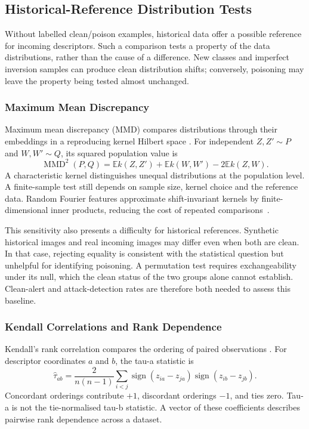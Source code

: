 \subsection{Historical-Reference Distribution Tests}
\label{subsec:bg-reference-tests}

Without labelled clean/poison examples, historical data offer a possible
reference for incoming descriptors. Such a comparison tests a property of
the data distributions, rather than the cause of a difference. New classes
and imperfect inversion samples can produce clean distribution shifts;
conversely, poisoning may leave the property being tested almost unchanged.

\subsubsection{Maximum Mean Discrepancy}

Maximum mean discrepancy (MMD) compares distributions through their
embeddings in a reproducing kernel Hilbert space
\cite{gretton2012mmd}. For independent $Z,Z'\sim P$ and $W,W'\sim Q$,
its squared population value is
\begin{equation}
 \operatorname{MMD}^2(P,Q)
 =\mathbb{E}k(Z,Z')+\mathbb{E}k(W,W')-2\mathbb{E}k(Z,W).
 \label{eq:bg-mmd}
\end{equation}
A characteristic kernel distinguishes unequal distributions at the
population level. A finite-sample test still depends on sample size,
kernel choice and the reference data. Random Fourier features approximate
shift-invariant kernels by finite-dimensional inner products, reducing
the cost of repeated comparisons~\cite{rahimi2007random}.

This sensitivity also presents a difficulty for historical references.
Synthetic historical images and real incoming images may differ even when
both are clean. In that case, rejecting equality is consistent with the
statistical question but unhelpful for identifying poisoning. A permutation
test requires exchangeability under its null, which the clean status of
the two groups alone cannot establish. Clean-alert and attack-detection
rates are therefore both needed to assess this baseline.

\subsubsection{Kendall Correlations and Rank Dependence}

Kendall's rank correlation compares the ordering of paired observations
\cite{kendall1938rank}. For descriptor coordinates $a$ and $b$, the
tau-a statistic is
\begin{equation}
 \widehat\tau_{ab}
 =\frac{2}{n(n-1)}\sum_{i<j}
   \operatorname{sign}(z_{ia}-z_{ja})
   \operatorname{sign}(z_{ib}-z_{jb}).
 \label{eq:bg-kendall}
\end{equation}
Concordant orderings contribute $+1$, discordant orderings $-1$, and ties
zero. Tau-a is not the tie-normalised tau-b statistic. A vector of these
coefficients describes pairwise rank dependence across a dataset.

